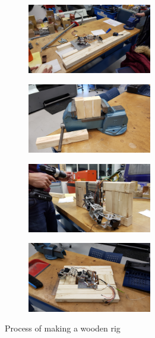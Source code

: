 \documentclass[11pt,a4paper, titlepage]{article}
\begin{document}
	\begin{figure}
	\centering
	
	
	\begin{subfigure}[t]{0.2\textwidth}
		
		\includegraphics[height=1.2in]{../Diagrams/plank1.jpg}
		
		
	\end{subfigure}%
	
	\begin{subfigure}[t]{0.2\textwidth}
		\centering
		\includegraphics[height=1.2in]{../Diagrams/plank2.jpg}
		
	\end{subfigure}%
	
	\begin{subfigure}[t]{0.2\textwidth}
		\includegraphics[height=1.2in]{../Diagrams/plank3.jpg}
		
	\end{subfigure}
	
	\begin{subfigure}[t]{0.2\textwidth}
		\includegraphics[height=1.2in]{../Diagrams/plank4.jpg}
		
	\end{subfigure}
	\caption{Process of making a wooden rig}
	\label{fig:plank-rig}	
	\end{figure}
	
\end{document}
